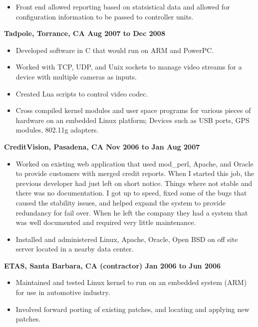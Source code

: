 \documentclass{res}
\begin{document}
\begin{resume}
\begin{itemize}
\item
Front end allowed reporting based on statsistical data and allowed
for configuration information to be passed to controller units.

\end{itemize}

{\large \bf Tadpole, Torrance, CA \hfill Aug 2007 to Dec 2008}
\begin{itemize}
\item Developed software in C that would run on ARM and PowerPC.
\item Worked with TCP, UDP, and Unix sockets to manage video streams for
a device with multiple cameras as inputs.
\item Created Lua scripts to control video codec.
\item Cross compiled kernel modules and user space programs for various
pieces of hardware on an embedded Linux platform; Devices such as USB
ports, GPS modules, 802.11g adapters.
\end{itemize}


{\large \bf CreditVision, Pasadena, CA \hfill Nov 2006 to Jan Aug 2007}
\begin{itemize}

\item Worked on existing web application that used mod\_perl, Apache,
and Oracle to provide customers with merged credit reports.  When I
started this job, the previous developer had just left on short notice.
Things where not stable and there was no documentation.  I got up to
speed, fixed some of the bugs that caused the stability issues, and
helped expand the system to provide redundancy for fail over.  When he
left the company they had a system that was well documented and required
very little maintenance.

\item Installed and administered Linux, Apache, Oracle, Open BSD on off
site server located in a nearby data center.

\end{itemize}

{\large \bf ETAS, Santa Barbara, CA (contractor) \hfill Jan 2006 to Jun 2006}
\begin{itemize}

\item Maintained and tested Linux kernel to run on an embedded system
(ARM) for use in automotive industry.

\item Involved forward porting of existing patches, and locating and
applying new patches.


\end{itemize}
\end{resume}
\end{document}
